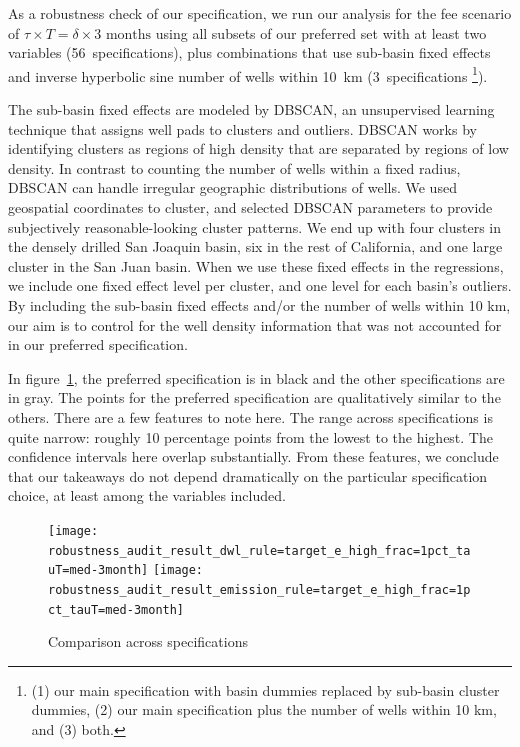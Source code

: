\documentclass[12pt,oneside,letterpaper]{article}
\theoremstyle{definition}
\begin{document}
\begin{refsection}
As a robustness check of our specification, we run our analysis for the fee scenario of \(\tau \times T = \delta \times \text{3 months}\) using all subsets of our preferred set with at least two variables (56~specifications), plus combinations that use sub-basin fixed effects and inverse hyperbolic sine number of wells within 10~km (3~specifications \footnote{(1) our main
specification with basin dummies replaced by sub-basin cluster dummies, (2) our main
specification plus the number of wells within 10 km, and (3) both.}).


The sub-basin fixed effects are modeled by \gls{DBSCAN}, an unsupervised learning technique that assigns well pads to clusters and outliers.
\gls{DBSCAN} works by identifying clusters as regions of high density that are separated by regions of low density.
In contrast to counting the number of wells within a fixed radius, \gls{DBSCAN} can handle irregular geographic distributions of wells.
We used geospatial coordinates to cluster, and selected \gls{DBSCAN} parameters to provide subjectively reasonable-looking cluster patterns.
We end up with four clusters in the densely drilled San Joaquin basin, six in the rest of California, and one large cluster in the San Juan basin.
When we use these fixed effects in the regressions, we include one fixed effect level per cluster, and one level for each basin's outliers.
By including the sub-basin fixed effects and/or the number of wells within 10 km, our aim is to control for the well density information that was not accounted for in our preferred specification.

In figure~\ref{fig:robustness-reg-spec}, the preferred specification is in black and the other specifications are in gray.
The points for the preferred specification are qualitatively similar to the others. There are a few features to note here.
The range across specifications is quite narrow: roughly 10 percentage points from the lowest to the highest.
The confidence intervals here overlap substantially.
From these features, we conclude that our takeaways do not depend dramatically on the particular specification choice, at least among the variables included.



\begin{figure}[!bthp]
  \caption{Comparison across specifications}
  \label{fig:robustness-reg-spec}
  \texttt{[image: robustness\_audit\_result\_dwl\_rule=target\_e\_high\_frac=1pct\_tauT=med-3month]}
  \texttt{[image: robustness\_audit\_result\_emission\_rule=target\_e\_high\_frac=1pct\_tauT=med-3month]}


\end{figure}
\end{refsection}
\end{document}
